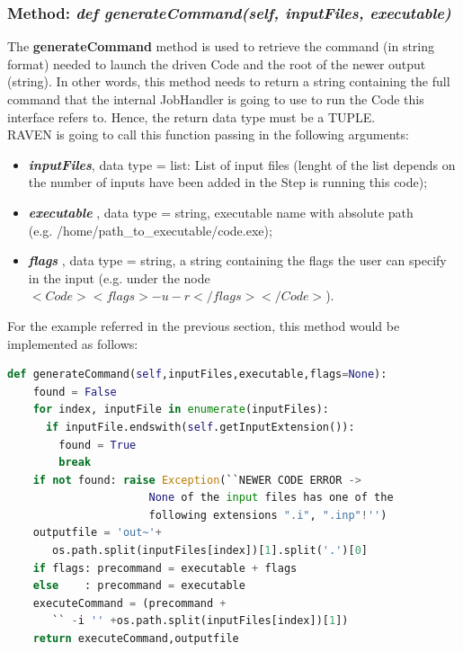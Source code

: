 \subsubsection{Method: \textit{def generateCommand(self, inputFiles, executable)}} 
\label{subsubsec:generateCommand}
The \textbf{generateCommand} method is used to retrieve the command 
(in string format) needed to launch the driven Code and the root of the newer output (string).
 In other words, this 
method needs to return a string containing the full command 
that the internal JobHandler is going to use to run the Code this interface refers to. 
Hence, the return data type must be a TUPLE.
\\RAVEN is going to call this function passing in the following arguments:
\begin{itemize}
  \item \textbf{\textit{inputFiles}}, data type = list: List of input files (lenght of the list depends on the 
           number of inputs  have been added in the Step is running this code);
  \item \textbf{\textit{executable}} , data type = string, executable name with absolute 
            path \\(e.g. /home/path\_to\_executable/code.exe);
  \item  \textbf{\textit{flags}} , data type = string, a string containing the flags the 
               user can specify in the input (e.g. under the node $<Code><flags>-u -r</flags></Code>$).
\end{itemize}
For the example referred in the previous section, this method would be implemented as follows:
\newline
\begin{lstlisting}[language=python]
  def generateCommand(self,inputFiles,executable,flags=None):
    found = False
    for index, inputFile in enumerate(inputFiles):
      if inputFile.endswith(self.getInputExtension()):
        found = True
        break
    if not found: raise Exception(``NEWER CODE ERROR ->
                      None of the input files has one of the
                      following extensions ".i", ".inp"!'')
    outputfile = 'out~'+
       os.path.split(inputFiles[index])[1].split('.')[0]
    if flags: precommand = executable + flags
    else    : precommand = executable
    executeCommand = (precommand +
       `` -i '' +os.path.split(inputFiles[index])[1])
    return executeCommand,outputfile
\end{lstlisting} 

